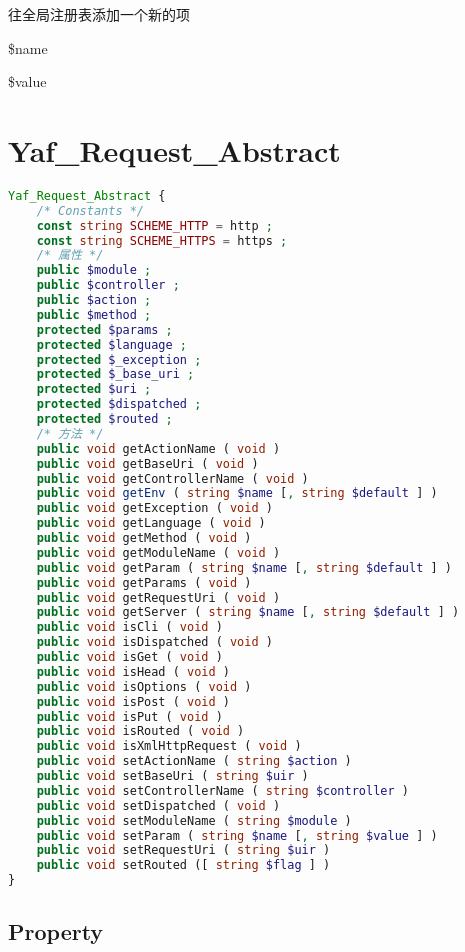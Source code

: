往全局注册表添加一个新的项

\begin{compactitem}
\item \$name
\item \$value
\end{compactitem}

\chapter{Yaf\_Request\_Abstract}





\begin{lstlisting}[language=PHP]
Yaf_Request_Abstract {
    /* Constants */
    const string SCHEME_HTTP = http ;
    const string SCHEME_HTTPS = https ;
    /* 属性 */
    public $module ;
    public $controller ;
    public $action ;
    public $method ;
    protected $params ;
    protected $language ;
    protected $_exception ;
    protected $_base_uri ;
    protected $uri ;
    protected $dispatched ;
    protected $routed ;
    /* 方法 */
    public void getActionName ( void )
    public void getBaseUri ( void )
    public void getControllerName ( void )
    public void getEnv ( string $name [, string $default ] )
    public void getException ( void )
    public void getLanguage ( void )
    public void getMethod ( void )
    public void getModuleName ( void )
    public void getParam ( string $name [, string $default ] )
    public void getParams ( void )
    public void getRequestUri ( void )
    public void getServer ( string $name [, string $default ] )
    public void isCli ( void )
    public void isDispatched ( void )
    public void isGet ( void )
    public void isHead ( void )
    public void isOptions ( void )
    public void isPost ( void )
    public void isPut ( void )
    public void isRouted ( void )
    public void isXmlHttpRequest ( void )
    public void setActionName ( string $action )
    public void setBaseUri ( string $uir )
    public void setControllerName ( string $controller )
    public void setDispatched ( void )
    public void setModuleName ( string $module )
    public void setParam ( string $name [, string $value ] )
    public void setRequestUri ( string $uir )
    public void setRouted ([ string $flag ] )
}
\end{lstlisting}


\section{Property}


